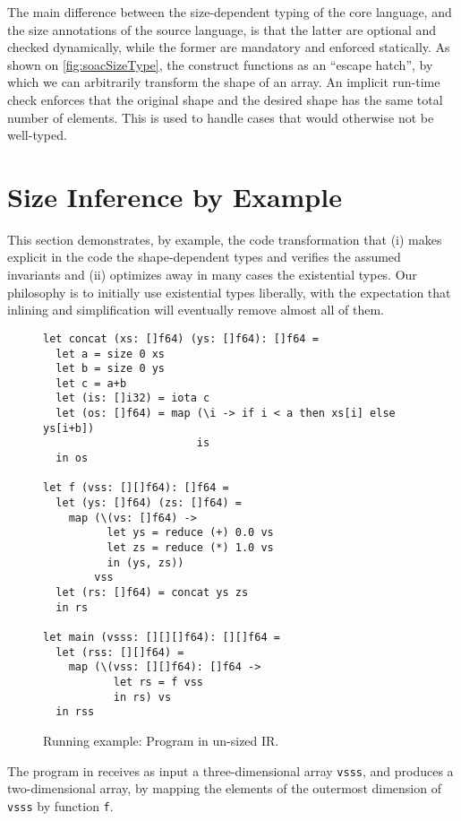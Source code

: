 The main difference between the size-dependent typing of the core
language, and the size annotations of the source language, is that the
latter are optional and checked dynamically, while the former are
mandatory and enforced statically.  As shown on
\cref{fig:soacSizeType}, the  construct functions as an
``escape hatch'', by which we can arbitrarily transform the shape of
an array.  An implicit run-time check enforces that the original shape
and the desired shape has the same total number of elements.  This is
used to handle cases that would otherwise not be well-typed.

\section{Size Inference by Example}
\label{sec:size-analysis-intuition}

This section demonstrates, by example, the code transformation that
(i) makes explicit in the code the shape-dependent types and verifies
the assumed invariants and (ii) optimizes away in many cases the
existential types.  Our philosophy is to initially use existential
types liberally, with the expectation that inlining and simplification
will eventually remove almost all of them.

\begin{figure}
\begin{lstlisting}
let concat (xs: []f64) (ys: []f64): []f64 =
  let a = size 0 xs
  let b = size 0 ys
  let c = a+b
  let (is: []i32) = iota c
  let (os: []f64) = map (\i -> if i < a then xs[i] else ys[i+b])
                        is
  in os

let f (vss: [][]f64): []f64 =
  let (ys: []f64) (zs: []f64) =
    map (\(vs: []f64) ->
          let ys = reduce (+) 0.0 vs
          let zs = reduce (*) 1.0 vs
          in (ys, zs))
        vss
  let (rs: []f64) = concat ys zs
  in rs

let main (vsss: [][][]f64): [][]f64 =
  let (rss: [][]f64) =
    map (\(vss: [][]f64): []f64 ->
           let rs = f vss
           in rs) vs
  in rss
\end{lstlisting}

\caption{Running example: Program in un-sized IR.} 
\label{fig:RunEgSrc}
\end{figure}

The program in  receives as input a
three-dimensional array \texttt{vsss}, and produces a two-dimensional
array, by mapping the elements of the outermost dimension of
\texttt{vsss} by function \texttt{f}.

